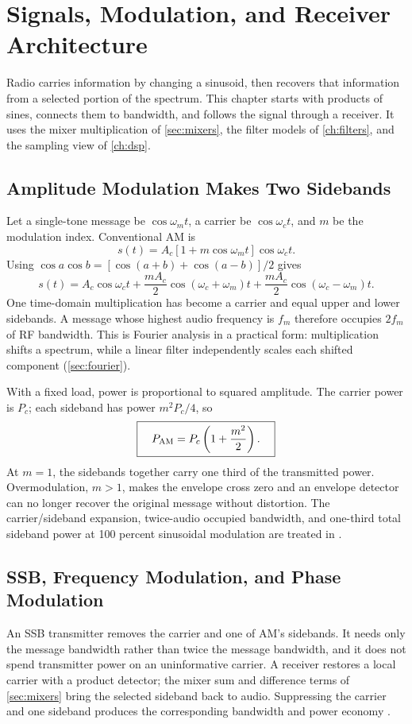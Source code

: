 \chapter{Signals, Modulation, and Receiver Architecture}
\label{ch:signals}
Radio carries information by changing a sinusoid, then recovers that information
from a selected portion of the spectrum.  This chapter starts with products of
sines, connects them to bandwidth, and follows the signal through a receiver.
It uses the mixer multiplication of \cref{sec:mixers}, the filter models of
\cref{ch:filters}, and the sampling view of \cref{ch:dsp}.

\section{Amplitude Modulation Makes Two Sidebands}
\label{sec:am}
Let a single-tone message be \(\cos\omega_m t\), a carrier be
\(\cos\omega_c t\), and \(m\) be the modulation index.  Conventional AM is
\[
s(t)=A_c[1+m\cos\omega_m t]\cos\omega_c t.
\]
Using \(\cos a\cos b=[\cos(a+b)+\cos(a-b)]/2\) gives
\[
\boxed{\;s(t)=A_c\cos\omega_ct+
\frac{mA_c}{2}\cos(\omega_c+\omega_m)t+
\frac{mA_c}{2}\cos(\omega_c-\omega_m)t.\;}
\]
One time-domain multiplication has become a carrier and equal upper and lower
sidebands.  A message whose highest audio frequency is \(f_m\) therefore
occupies \(2f_m\) of RF bandwidth.  This is Fourier analysis in a practical
form: multiplication shifts a spectrum, while a linear filter independently
scales each shifted component (\cref{sec:fourier}).

With a fixed load, power is proportional to squared amplitude.  The carrier
power is \(P_c\); each sideband has power \(m^2P_c/4\), so
\[
\boxed{\quad P_{\rm AM}=P_c\left(1+\frac{m^2}{2}\right).\quad}
\]
At \(m=1\), the sidebands together carry one third of the transmitted power.
Overmodulation, \(m>1\), makes the envelope cross zero and an envelope detector
can no longer recover the original message without distortion.
The carrier/sideband expansion, twice-audio occupied bandwidth, and one-third total
sideband power at 100 percent sinusoidal modulation are treated in
\cite[pp.~185--192]{carr2002components}.

\section{SSB, Frequency Modulation, and Phase Modulation}
\label{sec:anglemod}
An SSB transmitter removes the carrier and one of AM's sidebands.  It needs only
the message bandwidth rather than twice the message bandwidth, and it does not
spend transmitter power on an uninformative carrier.  A receiver restores a
local carrier with a product detector; the mixer sum and difference terms of
\cref{sec:mixers} bring the selected sideband back to audio.
Suppressing the carrier and one sideband produces the corresponding bandwidth and
power economy \cite[pp.~191--192]{carr2002components}.

